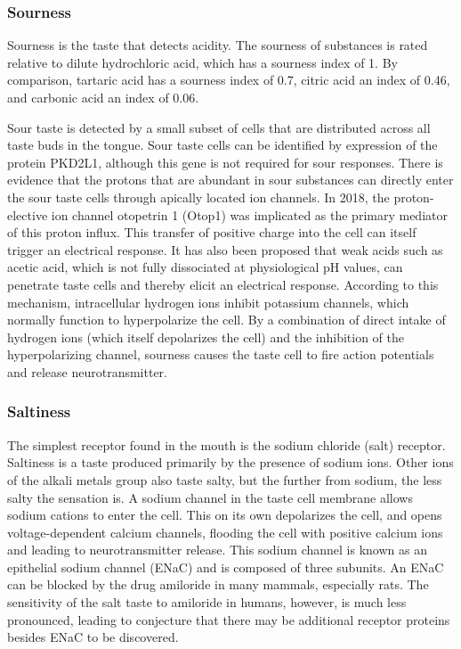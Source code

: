 \hypertarget{sourness}{%
\subsubsection{Sourness}\label{sourness}}

Sourness is the taste that detects acidity. The sourness of substances
is rated relative to dilute hydrochloric acid, which has a sourness
index of 1. By comparison, tartaric acid has a sourness index of 0.7,
citric acid an index of 0.46, and carbonic acid an index of 0.06.

Sour taste is detected by a small subset of cells that are distributed
across all taste buds in the tongue. Sour taste cells can be identified
by expression of the protein PKD2L1, although this gene is not required
for sour responses. There is evidence that the protons that are abundant
in sour substances can directly enter the sour taste cells through
apically located ion channels. In 2018, the proton-elective ion channel
otopetrin 1 (Otop1) was implicated as the primary mediator of this
proton influx. This transfer of positive charge into the cell can itself
trigger an electrical response. It has also been proposed that weak
acids such as acetic acid, which is not fully dissociated at
physiological pH values, can penetrate taste cells and thereby elicit an
electrical response. According to this mechanism, intracellular hydrogen
ions inhibit potassium channels, which normally function to
hyperpolarize the cell. By a combination of direct intake of hydrogen
ions (which itself depolarizes the cell) and the inhibition of the
hyperpolarizing channel, sourness causes the taste cell to fire action
potentials and release neurotransmitter.

\hypertarget{saltiness}{%
\subsubsection{Saltiness}\label{saltiness}}

The simplest receptor found in the mouth is the sodium chloride (salt)
receptor. Saltiness is a taste produced primarily by the presence of
sodium ions. Other ions of the alkali metals group also taste salty, but
the further from sodium, the less salty the sensation is. A sodium
channel in the taste cell membrane allows sodium cations to enter the
cell. This on its own depolarizes the cell, and opens voltage-dependent
calcium channels, flooding the cell with positive calcium ions and
leading to neurotransmitter release. This sodium channel is known as an
epithelial sodium channel (ENaC) and is composed of three subunits. An
ENaC can be blocked by the drug amiloride in many mammals, especially
rats. The sensitivity of the salt taste to amiloride in humans, however,
is much less pronounced, leading to conjecture that there may be
additional receptor proteins besides ENaC to be discovered.

